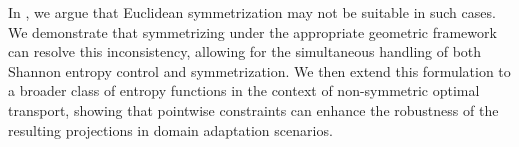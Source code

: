 In , we argue that Euclidean symmetrization may not be suitable in such cases. We demonstrate that symmetrizing under the appropriate geometric framework can resolve this inconsistency, allowing for the simultaneous handling of both Shannon entropy control and symmetrization. We then extend this formulation to a broader class of entropy functions in the context of non-symmetric optimal transport, showing that pointwise constraints can enhance the robustness of the resulting projections in domain adaptation scenarios.
